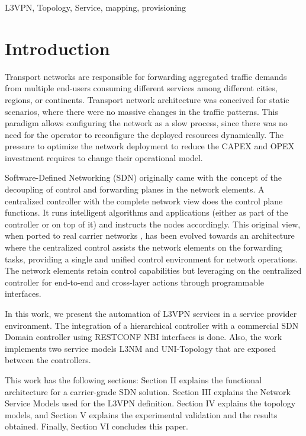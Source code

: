 \documentclass[conference]{IEEEtran}
\begin{document}
\begin{IEEEkeywords}
L3VPN, Topology, Service, mapping, provisioning
\end{IEEEkeywords}

\section{Introduction}
Transport networks are responsible for forwarding aggregated traffic demands from multiple end-users consuming different services among different cities, regions, or continents. Transport network architecture was conceived for static scenarios, where there were no massive changes in the traffic patterns. This paradigm allows configuring the network as a slow process, since there was no need for the operator to reconfigure the deployed resources dynamically. The pressure to optimize the network deployment to reduce the CAPEX and OPEX investment requires to change their operational model.

Software-Defined Networking (SDN) originally \cite{b1} came with the concept of the decoupling of control and forwarding planes in the network elements. A centralized controller with the complete network view does the control plane functions. It runs intelligent algorithms and applications (either as part of the controller or on top of it) and instructs the nodes accordingly. This original view, when ported to real carrier networks \cite{b2}, has been evolved towards an architecture where the centralized control assists the network elements on the forwarding tasks, providing a single and unified control environment for network operations. The network elements retain control capabilities but leveraging on the centralized controller for end-to-end and cross-layer actions through programmable interfaces. 

In this work, we present the automation of L3VPN services in a service provider environment. The integration of a hierarchical controller with a commercial SDN Domain controller using RESTCONF NBI interfaces is done. Also, the work implements two service models L3NM \cite{b3} and UNI-Topology \cite{b4} that are exposed between the controllers. 

This work has the following sections: Section II explains the functional architecture for a carrier-grade SDN solution. Section III explains the Network Service Models used for the L3VPN definition. Section IV explains the topology models, and Section V explains the experimental validation and the results obtained. Finally, Section VI concludes this paper.
\end{document}
